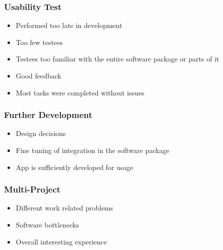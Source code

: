 		\begin{frame}
			\frametitle{Usability Test}
			\begin{itemize}
				\item Performed too late in development
				\item Too few testees
				\item Testees too familiar with the entire software package or parts of it
				\item Good feedback
				\item Most tasks were completed without issues
			\end{itemize}
		\end{frame}
		
		\begin{frame}
			\frametitle{Further Development}
			\begin{itemize}
				\item Design decisions
				\item Fine tuning of integration in the software package
				\item App is sufficiently developed for usage
			\end{itemize}
		\end{frame}
		
				
		\begin{frame}
			\frametitle{Multi-Project}
			\begin{itemize}
				\item Different work related problems
				\item Software bottlenecks
			     \item Overall interesting experience
			\end{itemize}
		\end{frame}